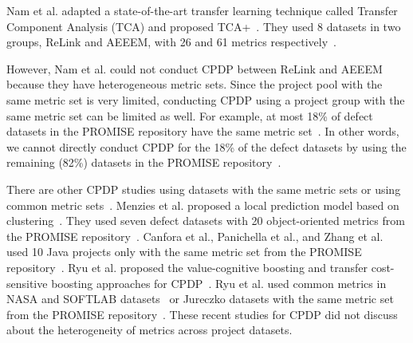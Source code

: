 Nam et al. adapted a state-of-the-art
transfer learning technique called Transfer Component Analysis (TCA) and
proposed TCA+~\cite{Nam13}. They used 8
datasets in two groups, ReLink and AEEEM, with 26 and 61 metrics
respectively~\cite{Nam13}.
% 

However, Nam et al. could not conduct CPDP between ReLink and AEEEM because they
have heterogeneous metric sets.
Since the project pool with the same metric set is very limited, conducting
CPDP using a project group with the same metric set can be
limited as well. For example, at most 18\% of defect datasets in the
PROMISE repository have the same metric set~\cite{promise12}. In other words,
we cannot directly conduct CPDP for the 18\% of the defect datasets by
using the remaining (82\%) datasets in the PROMISE
repository~\cite{promise12}.


There are other CPDP studies using datasets with the same metric sets or using common metric sets~\cite{Canfora13,me12d,promise12,Panichella14,Zhang15,Ryu14,Ryu15}.
Menzies et al. proposed a local prediction model based on clustering~\cite{me12d}. They used seven defect datasets with 20 object-oriented metrics from the PROMISE repository~\cite{me12d,promise12}.
Canfora et al., Panichella et al., and Zhang et al.
used 10 Java projects only with the same metric set from the PROMISE
repository~\cite{Canfora13,promise12,Panichella14,Zhang15}.
Ryu et al. proposed the value-cognitive boosting and transfer cost-sensitive boosting approaches for CPDP~\cite{Ryu14,Ryu15}. Ryu et al. used common metrics in NASA and SOFTLAB datasets~\cite{Ryu14} or Jureczko datasets with the same metric set from the PROMISE repository~\cite{Ryu15}. These recent studies for CPDP did not discuss about the heterogeneity of metrics across project datasets.




